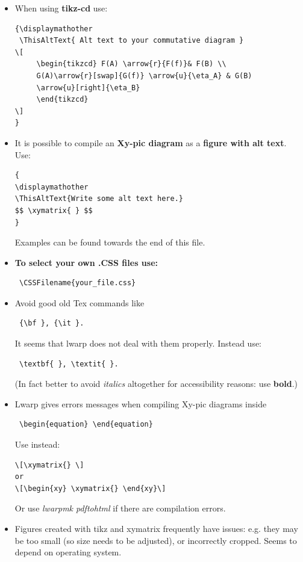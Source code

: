 \documentclass[a4paper,12pt]{article}
\newtheorem{Fundamental Theorem}{Fundamental Theorem}
\begin{document}
\begin{itemize}
Examples  can be found towards the end of this file.
\item When using \textbf{tikz-cd} use:
\begin{verbatim}
{\displaymathother
 \ThisAltText{ Alt text to your commutative diagram }
\[
     \begin{tikzcd} F(A) \arrow{r}{F(f)}& F(B) \\
     G(A)\arrow{r}[swap]{G(f)} \arrow{u}{\eta_A} & G(B)
     \arrow{u}[right]{\eta_B}
     \end{tikzcd}
\]
} 
\end{verbatim}
 


\item It is possible to compile an \textbf{Xy-pic diagram} as a \textbf{figure with alt text}. Use:
\begin{verbatim}
{
\displaymathother
\ThisAltText{Write some alt text here.}
$$ \xymatrix{ } $$
}
\end{verbatim}
  Examples  can be found towards the end of this file.


\item \textbf{To select your own  .CSS files use:}
\begin{verbatim}
 \CSSFilename{your_file.css}
\end{verbatim}

\item  Avoid good old Tex commands like 
\begin{verbatim} {\bf }, {\it }.\end{verbatim}

It seems that lwarp does not deal with them properly. Instead use: 
\begin{verbatim} \textbf{ }, \textit{ }.\end{verbatim}
(In fact better to avoid \textit{italics} altogether for accessibility reasons: use \textbf{bold}.) 
\item Lwarp  gives  errors messages when compiling  Xy-pic diagrams  inside
\begin{verbatim} \begin{equation} \end{equation}\end{verbatim}
Use instead:
\begin{verbatim}
\[\xymatrix{} \]
or
\[\begin{xy} \xymatrix{} \end{xy}\]
\end{verbatim}
Or use \emph{lwarpmk pdftohtml} if there are compilation errors.

\item Figures created with tikz and xymatrix frequently have issues: e.g. they may be too small (so size needs to be adjusted), or incorrectly cropped. Seems to depend on operating system.
\end{itemize}
\end{document}
